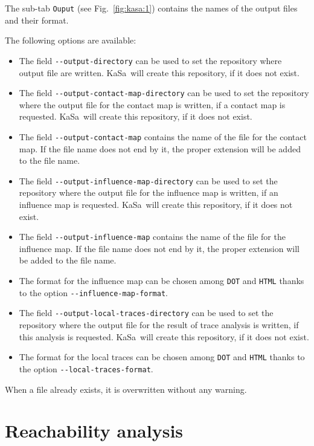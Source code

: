 \documentclass[11pt]{book}
\def\KaSa{\textsf{KaSa}}
\begin{document}
The sub-tab \texttt{Ouput} (see Fig.~\ref{fig:kasa:1}) contains the names of the output files and their format.

The following options are available:
\begin{itemize}
\item The field \texttt{-{}-output-directory} can be used to set the repository where output file are written. \KaSa~will create this repository, if it does not exist.
\item The field \texttt{-{}-output-contact-map-directory} can be used to set the repository where the output file for the contact map is written, if a contact map is requested. \KaSa~will create this repository, if it does not exist.
\item The field \texttt{-{}-output-contact-map} contains the name of the file for the contact map. If the file name does not end by it, the proper extension will be added to the file name.
\item The field \texttt{-{}-output-influence-map-directory} can be used to set the repository where the output file for the influence map is written, if an influence map is requested. \KaSa~will create this repository, if it does not exist.
\item The field \texttt{-{}-output-influence-map} contains the name of the file for the influence map. If the file name does not end by it, the proper extension will be added to the file name.
\item The format for the influence map can be chosen among \texttt{DOT} and \texttt{HTML} thanks to the option \texttt{-{}-influence-map-format}.
\item The field \texttt{-{}-output-local-traces-directory} can be used to set the repository where the output file for the result of trace analysis is written, if this analysis is requested. \KaSa~will create this repository, if it does not exist.
\item The format for the local traces can be chosen among \texttt{DOT} and \texttt{HTML} thanks to the option \texttt{-{}-local-traces-format}.


\end{itemize}

When a file already exists, it is overwritten without any warning.

\section{Reachability analysis}
\end{document}
